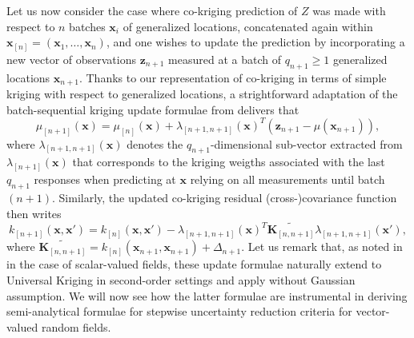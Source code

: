 \documentclass[aoas]{imsart}
\begin{document}
Let us now consider the case where co-kriging prediction of $Z$ was made with respect to $n$ batches $\bm{x}_i$ of generalized locations, concatenated again within
$\bm{x}_{[n]}=(\bm{x}_1,\dots, \bm{x}_n)$, and one wishes to update the prediction by incorporating a new vector of observations $\mathbf{z}_{n+1}$ measured at a batch of $q_{n+1} \geq 1$ generalized locations $\bm{x}_{n+1}$.
Thanks to our representation of co-kriging in terms of simple kriging with respect to generalized locations, a strightforward adaptation of the batch-sequential kriging update formulae from \citep{Chevalier.etal2013a} delivers that
% 
\begin{equation}\label{eq:meanCoK}
\mu_{[n+1]}(\bm{x})=\mu_{[n]}(\bm{x})+\lambda_{[n+1,n+1]}(\bm{x})^T (\mathbf{z}_{n+1}-\mu(\bm{x}_{n+1})),
\end{equation}
where $\lambda_{[n+1,n+1]}(\bm{x})$ denotes the $q_{n+1}$-dimensional sub-vector extracted from
$\lambda_{[n+1]}(\bm{x})$ that corresponds to the kriging weigths associated with the last $q_{n+1}$ responses when 
predicting at $\bm{x}$ relying on all measurements until batch $(n+1)$.
Similarly, the updated co-kriging residual (cross-)covariance function then writes
\begin{equation}\label{eq:varCoK}
k_{[n+1]}(\bm{x},\bm{x}')=k_{[n]}(\bm{x},\bm{x}')-\lambda_{[n+1,n+1]}(\bm{x})^T 
\widetilde{\bm{K}_{[n,n+1]}}
\lambda_{{[n+1,n+1]}}(\bm{x}'),
\end{equation}
%
where $\widetilde{\bm{K}_{[n,n+1]}}=k_{[n]}(\bm{x}_{n+1}, \bm{x}_{n+1})+\Delta_{n+1}$.
Let us remark that, as noted in \citep{Chevalier2015} in the case of scalar-valued fields, these update formulae naturally 
extend to Universal Kriging in second-order settings and apply without Gaussian assumption. We will now see how the latter formulae are instrumental in deriving semi-analytical formulae for stepwise uncertainty reduction criteria for 
vector-valued random fields.
\end{document}
